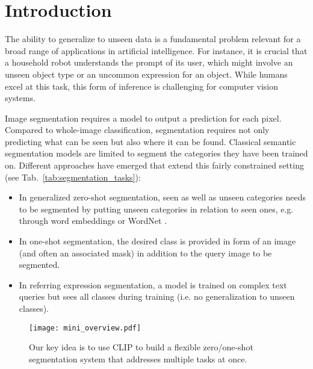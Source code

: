 \section{Introduction}

\let\thefootnote\relax{}

The ability to generalize to unseen data is a fundamental problem relevant for a broad range of applications in artificial intelligence. For instance, it is crucial that a household robot understands the prompt of its user, which might involve an unseen object type or an uncommon expression for an object. While humans excel at this task, this form of inference is challenging for computer vision systems. 

Image segmentation requires a model to output a prediction for each pixel. Compared to whole-image classification, segmentation requires not only predicting what can be seen but also where it can be found. 
Classical semantic segmentation models are limited to segment the categories they have been trained on. 
Different approaches have emerged that extend this fairly constrained setting (see Tab.~\ref{tab:segmentation_tasks}):
\begin{itemize}
\setlength\itemsep{0em}
    \item In generalized zero-shot segmentation, seen as well as unseen categories needs to be segmented by putting unseen categories in relation to seen ones, e.g. through word embeddings \cite{word2vec} or WordNet \cite{wordnet}. 
    \item In one-shot segmentation, the desired class is provided in form of an image (and often an associated mask) in addition to the query image to be segmented.
    \item In referring expression segmentation, a model is trained on complex text queries but sees all classes during training (i.e. no generalization to unseen classes).
\end{itemize}

\begin{figure}
    \centering
    \texttt{[image: mini\_overview.pdf]}
    \caption{Our key idea is to use CLIP to build a flexible zero/one-shot segmentation system that addresses multiple tasks at once.}
    \label{fig:mini_overview}
\end{figure}

